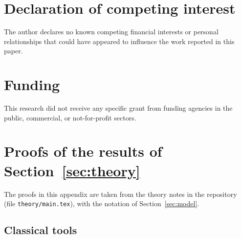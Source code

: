 \documentclass[preprint,12pt]{elsarticle}
\theoremstyle{definition}
\theoremstyle{remark}
\begin{document}
\section*{Declaration of competing interest}
The author declares no known competing financial interests or personal relationships that could have appeared to influence the work reported in this paper.

\section*{Funding}
This research did not receive any specific grant from funding agencies in the public, commercial, or not-for-profit sectors.




\appendix

\section{Proofs of the results of Section~\ref{sec:theory}}\label{app:proofs}

The proofs in this appendix are taken from the theory notes in the repository (file \texttt{theory/main.tex}), with the notation of Section~\ref{sec:model}.

\subsection{Classical tools}
\end{document}
